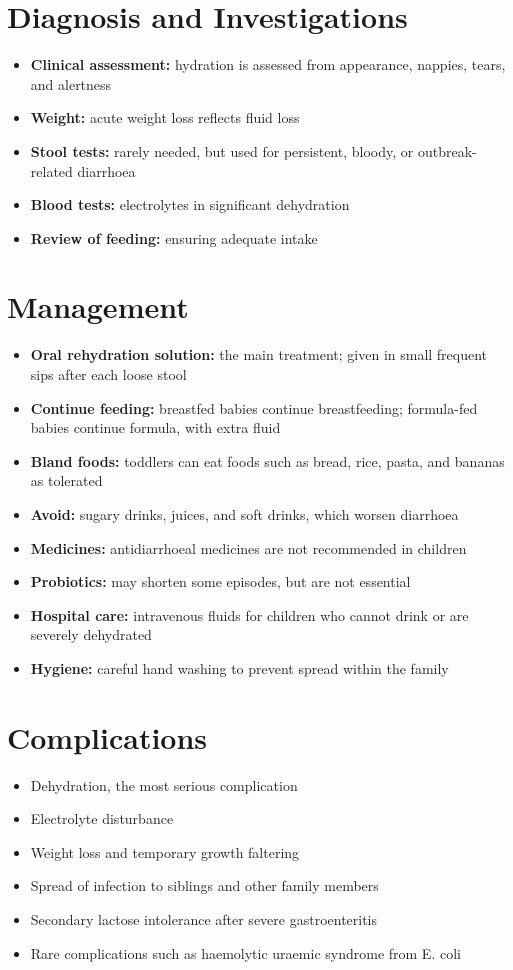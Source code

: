 \section*{Diagnosis and Investigations}
\begin{itemize}
    \item \textbf{Clinical assessment:} hydration is assessed from appearance, nappies, tears, and alertness
    \item \textbf{Weight:} acute weight loss reflects fluid loss
    \item \textbf{Stool tests:} rarely needed, but used for persistent, bloody, or outbreak-related diarrhoea
    \item \textbf{Blood tests:} electrolytes in significant dehydration
    \item \textbf{Review of feeding:} ensuring adequate intake
\end{itemize}

\section*{Management}
\begin{itemize}
    \item \textbf{Oral rehydration solution:} the main treatment; given in small frequent sips after each loose stool
    \item \textbf{Continue feeding:} breastfed babies continue breastfeeding; formula-fed babies continue formula, with extra fluid
    \item \textbf{Bland foods:} toddlers can eat foods such as bread, rice, pasta, and bananas as tolerated
    \item \textbf{Avoid:} sugary drinks, juices, and soft drinks, which worsen diarrhoea
    \item \textbf{Medicines:} antidiarrhoeal medicines are not recommended in children
    \item \textbf{Probiotics:} may shorten some episodes, but are not essential
    \item \textbf{Hospital care:} intravenous fluids for children who cannot drink or are severely dehydrated
    \item \textbf{Hygiene:} careful hand washing to prevent spread within the family
\end{itemize}

\section*{Complications}
\begin{itemize}
    \item Dehydration, the most serious complication
    \item Electrolyte disturbance
    \item Weight loss and temporary growth faltering
    \item Spread of infection to siblings and other family members
    \item Secondary lactose intolerance after severe gastroenteritis
    \item Rare complications such as haemolytic uraemic syndrome from E. coli
\end{itemize}

